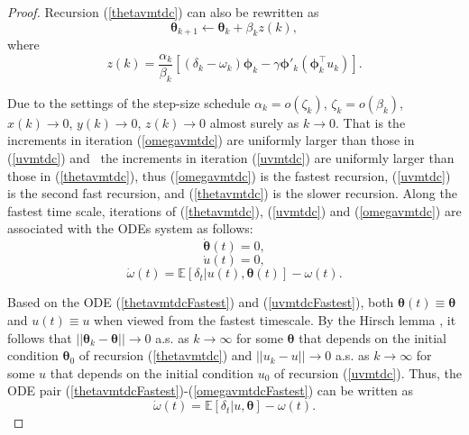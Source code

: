 \begin{proof}
    Recursion (\ref{thetavmtdc}) can also be rewritten as
    \begin{equation*}
     {\bm{\theta}}_{k+1}\leftarrow {\bm{\theta}}_k+\beta_k z(k),
    \end{equation*}
    where
    \begin{equation*}
     z(k)=\frac{\alpha_k}{\beta_k}[(\delta_{k}- \omega_k) {\bm{\phi}}_k - \gamma{\bm{\phi}}'_{k}({\bm{\phi}}^{\top}_k {u}_k)].
    \end{equation*}
    
    Due to the settings of the step-size schedule 
    $\alpha_k = o(\zeta_k)$, $\zeta_k = o(\beta_k)$, ${x}(k)\rightarrow 0$, ${y}(k)\rightarrow 0$, $z(k)\rightarrow 0$ almost surely as $k\rightarrow 0$.
    That is the increments in iteration (\ref{omegavmtdc}) are uniformly larger than
    those in (\ref{uvmtdc}) and  the increments in iteration (\ref{uvmtdc}) are uniformly larger than
    those in (\ref{thetavmtdc}), thus (\ref{omegavmtdc}) is the fastest recursion, (\ref{uvmtdc}) is the second fast recursion, and (\ref{thetavmtdc}) is the slower recursion.
    Along the fastest time scale, iterations of (\ref{thetavmtdc}), (\ref{uvmtdc}) and (\ref{omegavmtdc})
    are associated with the ODEs system as follows:
    \begin{equation}
     \dot{{\bm{\theta}}}(t) = 0,
        \label{thetavmtdcFastest}
    \end{equation}
    \begin{equation}
     \dot{{u}}(t) = 0,
        \label{uvmtdcFastest}
    \end{equation}
    \begin{equation}
     \dot{\omega}(t)=\mathbb{E}[\delta_t|{u}(t),{\bm{\theta}}(t)]-\omega(t).
        \label{omegavmtdcFastest}
    \end{equation}
    
    Based on the ODE (\ref{thetavmtdcFastest}) and (\ref{uvmtdcFastest}), both ${\bm{\theta}}(t)\equiv {\bm{\theta}}$
    and ${u}(t)\equiv {u}$ when viewed from the fastest timescale.
    By the Hirsch lemma \cite{hirsch1989convergent}, it follows that
    $||{\bm{\theta}}_k-{\bm{\theta}}||\rightarrow 0$ a.s. as $k\rightarrow \infty$ for some
    ${\bm{\theta}}$ that depends on the initial condition ${\bm{\theta}}_0$ of recursion
    (\ref{thetavmtdc}) and $||{u}_k-{u}||\rightarrow 0$ a.s. as $k\rightarrow \infty$ for some
    $u$ that depends on the initial condition $u_0$ of recursion
    (\ref{uvmtdc}). Thus, the ODE pair (\ref{thetavmtdcFastest})-(\ref{omegavmtdcFastest})
    can be written as 
    \begin{equation}
     \dot{\omega}(t)=\mathbb{E}[\delta_t|{u},{\bm{\theta}}]-\omega(t).
        \label{omegavmtdcFastestFinal}
    \end{equation}
    

\end{proof}
